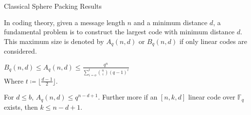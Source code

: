 \begin{frame}{Classical Sphere Packing Results}

In coding theory, given a message length \(n\) and a minimum distance \(d\), a fundamental problem is to construct the largest code with minimum distance \(d\). This maximum size is denoted by \(A_q(n,d)\) or \(B_q(n,d)\) if only linear codes are considered.
\quad

\begin{theorem} \label{hamming}
\(B_q(n,d) \leq A_q(n,d) \leq \frac{q^n}{\sum_{i=o}^t\binom{n}{i}(q-1)^i}\) \\

Where \(t \coloneqq \lfloor \frac{d-1}{2}\rfloor \).
\end{theorem}

\begin{theorem} \label{singleton}
For \(d \leq b\), \( A_q(n,d) \leq q^{n-d+1}\). Further more if an \([n,k,d]\)
linear code over \(\mathbb{F}_q\) exists, then \(k \leq n-d+1  \).  
\end{theorem}




              


\end{frame}
